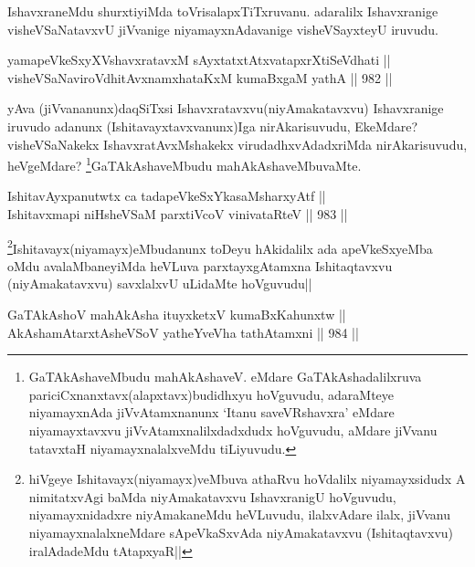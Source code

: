 \begin{artha}
IshavxraneMdu shurxtiyiMda toVrisalapxTiTxruvanu. adaralilx Ishavxranige visheVSaNatavxvU jiVvanige niyamayxnAdavanige visheVSayxteyU iruvudu.
\end{artha}


\begin{shl}
yamapeVkeSxyXVshavxratavxM sAyxtatxtAtxvatapxrXtiSeVdhati || \\
visheVSaNaviroVdhitAvxnamxhataKxM kumaBxgaM yathA ||  982 ||  
\end{shl}

\begin{artha}
yAva (jiVvananunx)daqSiTxsi Ishavxratavxvu(niyAmakatavxvu) Ishavxranige iruvudo adanunx (Ishitavayxtavxvanunx)Iga nirAkarisuvudu, EkeMdare? visheVSaNakekx IshavxratAvxMshakekx virudadhxvAdadxriMda nirAkarisuvudu, heVgeMdare? \footnote{GaTAkAshaveMbudu mahAkAshaveV. eMdare GaTAkAshadalilxruva pariciCxnanxtavx(alapxtavx)budidhxyu hoVguvudu, adaraMteye niyamayxnAda jiVvAtamxnanunx `Itanu saveVRshavxra' eMdare niyamayxtavxvu jiVvAtamxnalilxdadxdudx hoVguvudu, aMdare jiVvanu tatavxtaH niyamayxnalalxveMdu tiLiyuvudu.}GaTAkAshaveMbudu mahAkAshaveMbuvaMte.
\end{artha}

\begin{shl}
IshitavAyxpanutwtx ca tadapeVkeSxYkasaMsharxyAtf || \\
Ishitavxmapi niHsheVSaM parxtiVcoV vinivataRteV ||  983 ||  
\end{shl}

\begin{artha}
\footnote{hiVgeye Ishitavayx(niyamayx)veMbuva athaRvu hoVdalilx niyamayxsidudx A nimitatxvAgi baMda niyAmakatavxvu IshavxranigU hoVguvudu, niyamayxnidadxre niyAmakaneMdu heVLuvudu, ilalxvAdare ilalx, jiVvanu niyamayxnalalxneMdare sApeVkaSxvAda niyAmakatavxvu (Ishitaqtavxvu) iralAdadeMdu tAtapxyaR||}Ishitavayx(niyamayx)eMbudanunx toDeyu hAkidalilx ada apeVkeSxyeMba oMdu avalaMbaneyiMda heVLuva parxtayxgAtamxna Ishitaqtavxvu (niyAmakatavxvu) savxlalxvU uLidaMte hoVguvudu||
\end{artha}

\begin{shl}
GaTAkAshoV mahAkAsha ituyxketxV kumaBxKahunxtw || \\
AkAshamAtarxtAsheVSoV yatheYveVha tathA\s \s tamxni ||  984 ||  
\end{shl}


